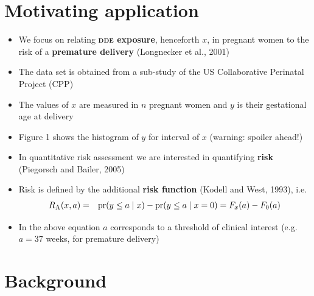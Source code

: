 \documentclass[a0,portrait]{a0poster}
\begin{document}
\begin{multicols}{2}
\section*{Motivating application}
\color{Black}
\begin{itemize}
\item[] We focus on relating {\bf \textsc{dde} exposure}, henceforth $x$, in pregnant women to the risk of a {\bf premature delivery} (Longnecker et al., 2001)
\item[] The data set is obtained from a sub-study of the US Collaborative Perinatal Project (CPP) 
\item[] The values of $x$ are measured in $n$ pregnant women and $y$ is their gestational age at delivery
\item[] Figure 1 shows the histogram of $y$ for interval of $x$ {\color{blue} (warning: spoiler ahead!)}
\end{itemize}



%     

\begin{itemize}
\item[] In quantitative risk assessment we are interested in quantifying {\bf risk} (Piegorsch and Bailer, 2005)
\item[] Risk is defined by the additional {\bf risk function }(Kodell and West, 1993), i.e.
\begin{eqnarray*} 
R_{\mbox{\textsc{a}}}(x,a) &=&  \mbox{pr}(y \leq a \mid x)- \mbox{pr}(y \leq a \mid x=0)=F_x(a)-F_0(a)
\label{add_risk}
\end{eqnarray*}
\item[] In the above equation $a$ corresponds to a threshold of clinical interest (e.g. $a=37$ weeks, for premature delivery)
\end{itemize}

\color{DarkRed}
\section*{Background}
\color{Black}


\end{multicols}
\end{document}
